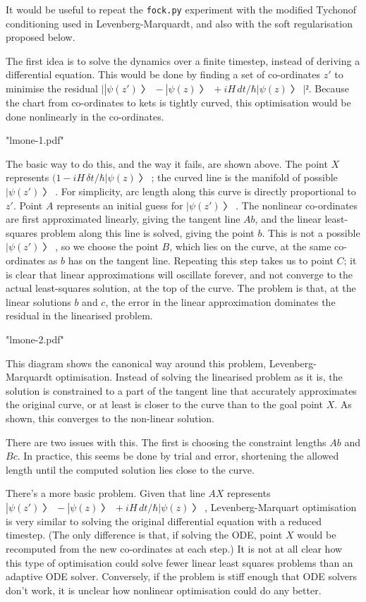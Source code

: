 It would be useful to repeat the {\tt fock.py} experiment with the modified Tychonof conditioning used in Levenberg-Marquardt, and also with the soft regularisation proposed below.


The first idea is to solve the dynamics over a finite timestep, instead of deriving a differential equation.  This would be done by finding a set of co-ordinates $z'$ to minimise the residual $\bigl| |ψ(z')〉-|ψ(z)〉+iH\,dt/\hbar|ψ(z)〉\bigr|².$  Because the chart from co-ordinates to kets is tightly curved, this optimisation would be done nonlinearly in the co-ordinates.

\centerline{\XeTeXpdffile "lmone-1.pdf"}

The basic way to do this, and the way it fails, are shown above.  The point $X$ represents $(1-iH\,δt/\hbar|ψ(z)〉$; the curved line is the manifold of possible $|ψ(z')〉$.  For simplicity, arc length along this curve is directly proportional to $z'$.  Point $A$ represents an initial guess for $|ψ(z')〉$.  The nonlinear co-ordinates are first approximated linearly, giving the tangent line $Ab$, and the linear least-squares problem along this line is solved, giving the point $b$.  This is not a possible $|ψ(z')〉$, so we choose the point $B$, which lies on the curve, at the same co-ordinates as $b$ has on the tangent line.  Repeating this step takes us to point $C$; it is clear that linear approximations will oscillate forever, and not converge to the actual least-squares solution, at the top of the curve.  The problem is that, at the linear solutions $b$ and $c$, the error in the linear approximation dominates the residual in the linearised problem.

\centerline{\XeTeXpdffile "lmone-2.pdf"}

This diagram shows the canonical way around this problem, Levenberg-Marquardt optimisation.  Instead of solving the linearised problem as it is, the solution is constrained to a part of the tangent line that accurately approximates the original curve, or at least is closer to the curve than to the goal point $X$.  As shown, this converges to the non-linear solution.

There are two issues with this.  The first is choosing the constraint lengths $Ab$ and $Bc$.  In practice, this seems be done by trial and error, shortening the allowed length until the computed solution lies close to the curve.

There's a more basic problem.  Given that line $AX$ represents $|ψ(z')〉-|ψ(z)〉+iH\,dt/\hbar|ψ(z)〉$, Levenberg-Marquart optimisation is very similar to solving the original differential equation with a reduced timestep.  (The only difference is that, if solving the ODE, point $X$ would be recomputed from the new co-ordinates at each step.)  It is not at all clear how this type of optimisation could solve fewer linear least squares problems than an adaptive ODE solver.  Conversely, if the problem is stiff enough that ODE solvers don't work, it is unclear how nonlinear optimisation could do any better.

